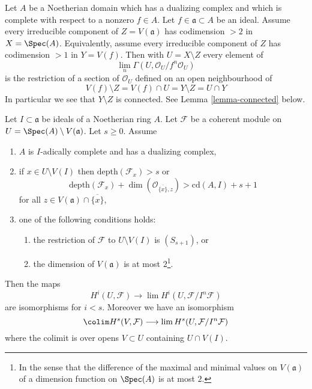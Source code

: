 \begin{example}
\label{example-H0}
Let $A$ be a Noetherian domain which has a dualizing complex
and which is complete with respect to a nonzero $f \in A$.
Let $f \in \mathfrak a \subset A$ be an ideal.
Assume every irreducible component of $Z = V(\mathfrak a)$
has codimension $> 2$ in $X = \Spec(A)$. Equivalently, assume every
irreducible component of $Z$ has codimension $> 1$ in $Y = V(f)$.
Then with
$U = X \setminus Z$ every element of
$$
\lim_n \Gamma(U, \mathcal{O}_U/f^n \mathcal{O}_U)
$$
is the restriction of a section of $\mathcal{O}_U$ defined on an
open neighbourhood of
$$
V(f) \setminus Z = V(f) \cap U = Y \setminus Z = U \cap Y
$$
In particular we see that $Y \setminus Z$ is connected. See
Lemma \ref{lemma-connected} below.
\end{example}

\begin{proposition}
\label{proposition-application-higher}
Let $I \subset \mathfrak a$ be ideals of a Noetherian ring $A$.
Let $\mathcal{F}$ be a coherent module on
$U = \Spec(A) \setminus V(\mathfrak a)$.
Let $s \geq 0$.
Assume
\begin{enumerate}
\item $A$ is $I$-adically complete and has a dualizing complex,
\item if $x \in U \setminus V(I)$ then
$\text{depth}(\mathcal{F}_x) > s$ or
$$
\text{depth}(\mathcal{F}_x) +
\dim(\mathcal{O}_{\overline{\{x\}}, z}) > \text{cd}(A, I) + s + 1
$$
for all $z \in V(\mathfrak a) \cap \overline{\{x\}}$,
\item one of the following conditions holds:
\begin{enumerate}
\item the restriction of $\mathcal{F}$ to $U \setminus V(I)$
is $(S_{s + 1})$, or
\item the dimension of $V(\mathfrak a)$ is at most $2$\footnote{In
the sense that the difference of the maximal and minimal values
on $V(\mathfrak a)$ of a dimension function on $\Spec(A)$ is at most $2$.}.
\end{enumerate}
\end{enumerate}
Then the maps
$$
H^i(U, \mathcal{F})
\longrightarrow
\lim H^i(U, \mathcal{F}/I^n\mathcal{F})
$$
are isomorphisms for $i < s$. Moreover we have an isomorphism
$$
\colim H^s(V, \mathcal{F})
\longrightarrow
\lim H^s(U, \mathcal{F}/I^n\mathcal{F})
$$
where the colimit is over opens $V \subset U$ containing $U \cap V(I)$.
\end{proposition}


